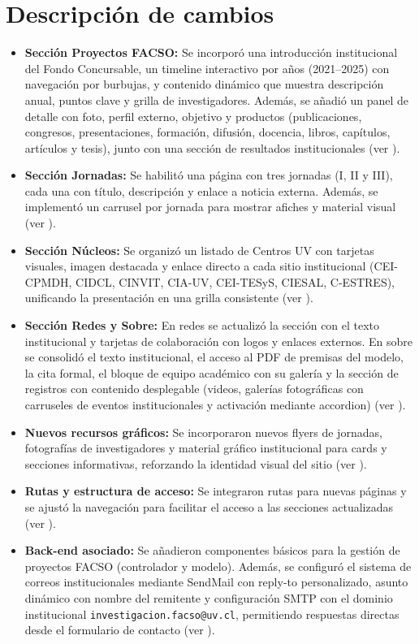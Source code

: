 \documentclass[12pt]{article}
\begin{document}
\section*{Descripción de cambios}
\begin{itemize}
    \item \textbf{Sección Proyectos FACSO:} Se incorporó una introducción institucional del Fondo Concursable, un timeline interactivo por años (2021--2025) con navegación por burbujas, y contenido dinámico que muestra descripción anual, puntos clave y grilla de investigadores. Además, se añadió un panel de detalle con foto, perfil externo, objetivo y productos (publicaciones, congresos, presentaciones, formación, difusión, docencia, libros, capítulos, artículos y tesis), junto con una sección de resultados institucionales (ver ).
    \item \textbf{Sección Jornadas:} Se habilitó una página con tres jornadas (I, II y III), cada una con título, descripción y enlace a noticia externa. Además, se implementó un carrusel por jornada para mostrar afiches y material visual (ver ).
    \item \textbf{Sección Núcleos:} Se organizó un listado de Centros UV con tarjetas visuales, imagen destacada y enlace directo a cada sitio institucional (CEI-CPMDH, CIDCL, CINVIT, CIA-UV, CEI-TESyS, CIESAL, C-ESTRES), unificando la presentación en una grilla consistente (ver ).
    \item \textbf{Sección Redes y Sobre:} En redes se actualizó la sección con el texto institucional y tarjetas de colaboración con logos y enlaces externos. En sobre se consolidó el texto institucional, el acceso al PDF de premisas del modelo, la cita formal, el bloque de equipo académico con su galería y la sección de registros con contenido desplegable (videos, galerías fotográficas con carruseles de eventos institucionales y activación mediante accordion) (ver ).
    \item \textbf{Nuevos recursos gráficos:} Se incorporaron nuevos flyers de jornadas, fotografías de investigadores y material gráfico institucional para cards y secciones informativas, reforzando la identidad visual del sitio (ver ).
    \item \textbf{Rutas y estructura de acceso:} Se integraron rutas para nuevas páginas y se ajustó la navegación para facilitar el acceso a las secciones actualizadas (ver ).
    \item \textbf{Back-end asociado:} Se añadieron componentes básicos para la gestión de proyectos FACSO (controlador y modelo). Además, se configuró el sistema de correos institucionales mediante SendMail con reply-to personalizado, asunto dinámico con nombre del remitente y configuración SMTP con el dominio institucional \texttt{investigacion.facso@uv.cl}, permitiendo respuestas directas desde el formulario de contacto (ver ).
\end{itemize}
\end{document}
